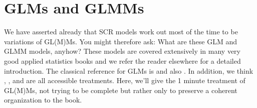 \section{
GLMs and GLMMs}
\label{glms.sec.glmms}
We have asserted already that SCR models work out most of the time to
be variations of GL(M)Ms. You might therefore ask: What
are these GLM and GLMM models, anyhow?   These models are covered extensively in
many very good applied statistics books and we refer the reader
elsewhere for a detailed introduction.  The
classical reference for GLMs is \citet{nelder_wedderburn:1972} and
also \citet{mccullagh_nelder:1989}. In addition, we think \citet{kery:2010},
\citet{kery_schaub:2011}, and \citet{zuur_etal:2009} are all
accessible treatments.
Here, we'll give the 1
minute
treatment of GL(M)Ms, not trying to be complete but rather only
to preserve a coherent organization to the book.


